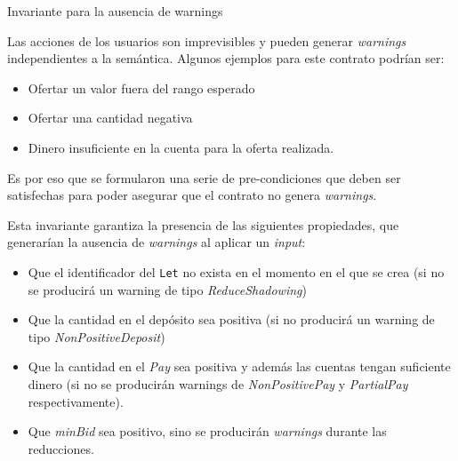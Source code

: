 \documentclass{beamer}
\begin{document}
\begin{frame}{Invariante para la ausencia de warnings}

Las acciones de los usuarios son imprevisibles y pueden generar \textit{warnings} independientes a la semántica. Algunos ejemplos para este contrato podrían ser:
\medskip

   \begin{itemize}
           \pause
       \item Ofertar un valor fuera del rango esperado
           \pause
       \item Ofertar una cantidad negativa
           \pause
       \item Dinero insuficiente en la cuenta para la oferta realizada.
           \pause
   \end{itemize} 

\medskip

Es por eso que se formularon una serie de pre-condiciones que deben ser satisfechas para poder asegurar que el contrato no genera \textit{warnings}.

\end{frame}

\begin{frame}
Esta invariante garantiza la presencia de las siguientes propiedades, que generarían la ausencia de \textit{warnings} al aplicar un \textit{input}:

\bigskip

\begin{itemize}
    \pause
    \item Que el identificador del \texttt{Let} no exista en el momento en el que se crea (si no se producirá un warning de tipo \textit{ReduceShadowing})
    \pause
    \item Que la cantidad en el depósito sea positiva (si no producirá un warning de tipo \textit{NonPositiveDeposit})
    \pause
    \item Que la cantidad en el \textit{Pay} sea positiva y además las cuentas tengan suficiente dinero (si no se producirán warnings de \textit{NonPositivePay} y \textit{PartialPay} respectivamente).
    \pause
    \item Que \textit{minBid} sea positivo, sino se producirán \textit{warnings} durante las reducciones.
\end{itemize}


\end{frame}
\end{document}
